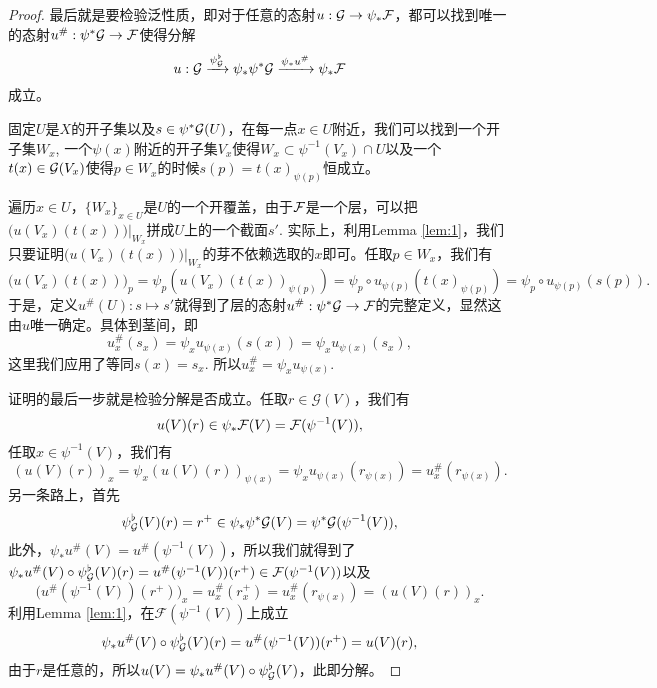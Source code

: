\begin{proof}
	最后就是要检验泛性质，即对于任意的态射$u:\mathcal{G} \to \psi_*\mathcal{F}$，都可以找到唯一的态射$u^\#:\psi^*\mathcal{G} \to \mathcal{F}$使得分解
	\[
		u:\mathcal{G}\xrightarrow{\psi^\flat_{\mathcal{G}}} \psi_*\psi^*\mathcal{G} \xrightarrow{\psi_*u^\#} \psi_*\mathcal{F}
	\]
	成立。

	固定$U$是$X$的开子集以及$s\in \psi^*\mathcal{G}(U)$，在每一点$x\in U$附近，我们可以找到一个开子集$W_x$, 一个$\psi(x)$附近的开子集$V_x$使得$W_x\subset \psi^{-1}(V_x)\cap U$以及一个$t(x)\in \mathcal{G}(V_x)$使得$p\in W_x$的时候$s(p)=t(x)_{\psi(p)}$恒成立。



	遍历$x\in U$，$\{W_x\}_{x\in U}$是$U$的一个开覆盖，由于$\mathcal{F}$是一个层，可以把$\bigl(u(V_x)(t(x))\bigr)|_{W_x}$拼成$U$上的一个截面$s'$. 实际上，利用Lemma \ref{lem:1}，我们只要证明$\bigl(u(V_x)(t(x))\bigr)|_{W_x}$的芽不依赖选取的$x$即可。任取$p\in W_x$，我们有
	\[
	\bigl(u(V_x)(t(x))\bigr)_p=\psi_p\left(u(V_x)(t(x))_{\psi(p)}\right)=\psi_p\circ u_{\psi(p)}(t(x)_{\psi(p)})=\psi_p\circ u_{\psi(p)}(s(p)).
	\]
	于是，定义$u^\#(U):s\mapsto s'$就得到了层的态射$u^\#:\psi^*\mathcal{G} \to \mathcal{F}$的完整定义，显然这由$u$唯一确定。具体到茎间，即
	\[
	u^\#_x(s_x)=\psi_x u_{\psi(x)}(s(x))=\psi_x u_{\psi(x)}(s_x),
	\]
	这里我们应用了等同$s(x)=s_x$. 所以$u^\#_x=\psi_x u_{\psi(x)}$.

	证明的最后一步就是检验分解是否成立。任取$r\in \mathcal{G}(V)$，我们有
	\[
	u(V)(r)\in \psi_*\mathcal{F}(V)=\mathcal{F}(\psi^{-1}(V)),
	\]
	任取$x\in \psi^{-1}(V)$，我们有
	\[
	(u(V)(r))_x=\psi_x (u(V)(r))_{\psi(x)}=\psi_x u_{\psi(x)}(r_{\psi(x)})=u^\#_x(r_{\psi(x)}).
	\]
	另一条路上，首先
	\[
	\psi^\flat_{\mathcal{G}}(V)(r)=r^+\in \psi_*\psi^*\mathcal{G}(V)= \psi^*\mathcal{G}(\psi^{-1}(V)),
	\]
	此外，$\psi_*u^\#(V)=u^\#(\psi^{-1}(V))$，所以我们就得到了$\psi_*u^\#(V)\circ \psi^\flat_{\mathcal{G}}(V)(r)=u^\#(\psi^{-1}(V))(r^+)\in \mathcal{F}(\psi^{-1}(V))$以及
	\[
	\bigl(u^\#(\psi^{-1}(V))(r^+)\bigr)_x=u^\#_x(r^+_x)=u^\#_x(r_{\psi(x)})=(u(V)(r))_x.
	\]
	利用Lemma \ref{lem:1}，在$\mathcal{F}(\psi^{-1}(V))$上成立
	\[
	\psi_*u^\#(V)\circ \psi^\flat_{\mathcal{G}}(V)(r)=u^\#(\psi^{-1}(V))(r^+)=u(V)(r),
	\]
	由于$r$是任意的，所以$u(V)=\psi_*u^\#(V)\circ \psi^\flat_{\mathcal{G}}(V)$，此即分解。
\end{proof}

